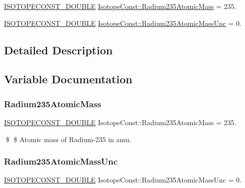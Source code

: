 \begin{DoxyCompactItemize}
\item 
\mbox{\hyperlink{group___isotope_const-_macros_ga8f45a7272ce02c0b4c65c44636ed719a}{I\+S\+O\+T\+O\+P\+E\+C\+O\+N\+S\+T\+\_\+\+D\+O\+U\+B\+LE}} \mbox{\hyperlink{group___isotope_const-_radium-_ra235_ga86618d8f39ea66f83da44fb4320dee04}{Isotope\+Const\+::\+Radium235\+Atomic\+Mass}} = 235.
\item 
\mbox{\hyperlink{group___isotope_const-_macros_ga8f45a7272ce02c0b4c65c44636ed719a}{I\+S\+O\+T\+O\+P\+E\+C\+O\+N\+S\+T\+\_\+\+D\+O\+U\+B\+LE}} \mbox{\hyperlink{group___isotope_const-_radium-_ra235_ga93d45fad4fac7b7121ff72a546810569}{Isotope\+Const\+::\+Radium235\+Atomic\+Mass\+Unc}} = 0.
\end{DoxyCompactItemize}


\subsection{Detailed Description}


\subsection{Variable Documentation}
\mbox{\label{group___isotope_const-_radium-_ra235_ga86618d8f39ea66f83da44fb4320dee04}} 
\subsubsection{\texorpdfstring{Radium235\+Atomic\+Mass}{Radium235AtomicMass}}
{\footnotesize\ttfamily \mbox{\hyperlink{group___isotope_const-_macros_ga8f45a7272ce02c0b4c65c44636ed719a}{I\+S\+O\+T\+O\+P\+E\+C\+O\+N\+S\+T\+\_\+\+D\+O\+U\+B\+LE}} Isotope\+Const\+::\+Radium235\+Atomic\+Mass = 235.}

\$ \$ Atomic mass of Radium-\/235 in amu. \mbox{\label{group___isotope_const-_radium-_ra235_ga93d45fad4fac7b7121ff72a546810569}} 
\subsubsection{\texorpdfstring{Radium235\+Atomic\+Mass\+Unc}{Radium235AtomicMassUnc}}
{\footnotesize\ttfamily \mbox{\hyperlink{group___isotope_const-_macros_ga8f45a7272ce02c0b4c65c44636ed719a}{I\+S\+O\+T\+O\+P\+E\+C\+O\+N\+S\+T\+\_\+\+D\+O\+U\+B\+LE}} Isotope\+Const\+::\+Radium235\+Atomic\+Mass\+Unc = 0.}

